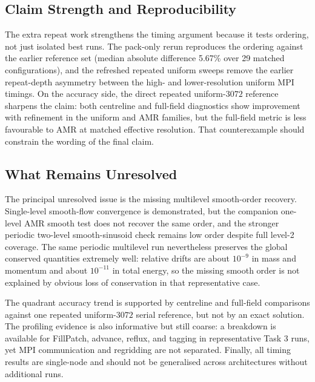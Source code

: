 \documentclass[final,3p,times,twocolumn]{elsarticle}
\newif\ifwithpaths
\DeclareRobustCommand{\pathnote}[1]{\ifwithpaths\textit{ [source: \nolinkurl{#1}]}\fi}
\begin{document}
\subsection{Claim Strength and Reproducibility}

The extra repeat work strengthens the timing argument because it tests ordering, not just isolated best runs. The pack-only rerun reproduces the ordering against the earlier reference set (median absolute difference 5.67\% over 29 matched configurations), and the refreshed repeated uniform sweeps remove the earlier repeat-depth asymmetry between the high- and lower-resolution uniform MPI timings. On the accuracy side, the direct repeated uniform-$3072$ reference sharpens the claim: both centreline and full-field diagnostics show improvement with refinement in the uniform and AMR families, but the full-field metric is less favourable to AMR at matched effective resolution. That counterexample should constrain the wording of the final claim.

\subsection{What Remains Unresolved}

The principal unresolved issue is the missing multilevel smooth-order recovery. Single-level smooth-flow convergence is demonstrated, but the companion one-level AMR smooth test does not recover the same order, and the stronger periodic two-level smooth-sinusoid check remains low order despite full level-2 coverage. The same periodic multilevel run nevertheless preserves the global conserved quantities extremely well: relative drifts are about $10^{-9}$ in mass and momentum and about $10^{-11}$ in total energy, so the missing smooth order is not explained by obvious loss of conservation in that representative case.\pathnote{new_campaign/Euler_AmrLevel/Exec/Euler1D/results_smooth_amr_convergence_20260308_001836/checks/smooth_conservation.md}

The quadrant accuracy trend is supported by centreline and full-field comparisons against one repeated uniform-$3072$ serial reference, but not by an exact solution. The profiling evidence is also informative but still coarse: a breakdown is available for FillPatch, advance, reflux, and tagging in representative Task 3 runs, yet MPI communication and regridding are not separated. Finally, all timing results are single-node and should not be generalised across architectures without additional runs.
\end{document}
